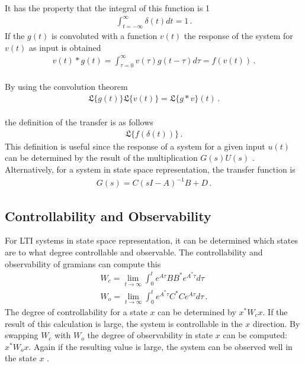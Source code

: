 It has the property that the integral of this function is 1
\begin{gather}
\int_{t = -\infty}^{\infty} \delta(t) dt = 1 \,.
\end{gather}
If the \(g(t)\) is convoluted with a function \(v(t)\) the response of the system for \(v(t)\) as input is obtained \cite{DouglasBb}
\begin{gather}
v(t)*g(t) = \int_{\tau = 0}^{\infty} v(\tau)g(t-\tau)d\tau = f(v(t)) \,.
\end{gather}
 \\
By using the convolution theorem \cite{ABELL2018399}
\begin{gather}
\mathfrak{L}\{g(t)\}\mathfrak{L}\{v(t)\} = \mathfrak{L}\{g*v\}(t) \,.
\end{gather}
\\
the definition of the transfer is as follows
\begin{gather}
\mathfrak{L}\{f(\delta(t))\} \,.
\end{gather}
This definition is useful since the response of a system for a given input \(u(t)\) can be determined by the result of the multiplication \(G(s)U(s)\) \cite{DouglasBb}.
Alternatively, for a system in state space representation, the transfer function is
\begin{gather}
G(s) = C(sI-A)^{-1}B+D \,. \label{tf-from-ss}
\end{gather}
\cite{BennerGrivet}

\subsection{Controllability and Observability}
For LTI systems in state space representation, it can be determined which states are to what degree controllable and observable.
The controllability and observability of gramians can compute this
\begin{gather}
W_c = \lim_{t \to \infty} \int_{0}^{t} e^{A\tau}BB^{*}e^{A^{*}\tau}d\tau \label{gram-ctrl}\\
W_o = \lim_{t \to \infty} \int_{0}^{t} e^{A^{*}\tau}C^{*}Ce^{A\tau}d\tau \,. \label{gram-obsv}
\end{gather}
The degree of controllability for a state \(x\) can be determined by \(x^{*}W_cx\).
If the result of this calculation is large, the system is controllable in the \(x\) direction.
By swapping \(W_c\) with \(W_o\) the degree of observability in state \(x\) can be computed: \(x^{*}W_ox\).
Again if the resulting value is large, the system can be observed well in the state \(x\) \cite{brunton_kutz_2019d}.

